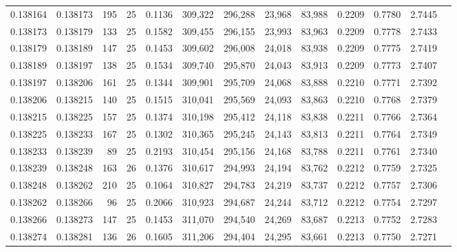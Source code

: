 \begin{tabular}{rrrrrrrrrrrrr}
0.138164 & 0.138173 &   195 &  25 &                                     0.1136 & 309,322 & 296,288 &  23,968 &  83,988 & 0.2209 & 0.7780 & 2.7445 \\
0.138173 & 0.138179 &   133 &  25 &                                     0.1582 & 309,455 & 296,155 &  23,993 &  83,963 & 0.2209 & 0.7778 & 2.7433 \\
0.138179 & 0.138189 &   147 &  25 &                                     0.1453 & 309,602 & 296,008 &  24,018 &  83,938 & 0.2209 & 0.7775 & 2.7419 \\
0.138189 & 0.138197 &   138 &  25 &                                     0.1534 & 309,740 & 295,870 &  24,043 &  83,913 & 0.2209 & 0.7773 & 2.7407 \\
0.138197 & 0.138206 &   161 &  25 &                                     0.1344 & 309,901 & 295,709 &  24,068 &  83,888 & 0.2210 & 0.7771 & 2.7392 \\
0.138206 & 0.138215 &   140 &  25 &                                     0.1515 & 310,041 & 295,569 &  24,093 &  83,863 & 0.2210 & 0.7768 & 2.7379 \\
0.138215 & 0.138225 &   157 &  25 &                                     0.1374 & 310,198 & 295,412 &  24,118 &  83,838 & 0.2211 & 0.7766 & 2.7364 \\
0.138225 & 0.138233 &   167 &  25 &                                     0.1302 & 310,365 & 295,245 &  24,143 &  83,813 & 0.2211 & 0.7764 & 2.7349 \\
0.138233 & 0.138239 &    89 &  25 &                                     0.2193 & 310,454 & 295,156 &  24,168 &  83,788 & 0.2211 & 0.7761 & 2.7340 \\
0.138239 & 0.138248 &   163 &  26 &                                     0.1376 & 310,617 & 294,993 &  24,194 &  83,762 & 0.2212 & 0.7759 & 2.7325 \\
0.138248 & 0.138262 &   210 &  25 &                                     0.1064 & 310,827 & 294,783 &  24,219 &  83,737 & 0.2212 & 0.7757 & 2.7306 \\
0.138262 & 0.138266 &    96 &  25 &                                     0.2066 & 310,923 & 294,687 &  24,244 &  83,712 & 0.2212 & 0.7754 & 2.7297 \\
0.138266 & 0.138273 &   147 &  25 &                                     0.1453 & 311,070 & 294,540 &  24,269 &  83,687 & 0.2213 & 0.7752 & 2.7283 \\
0.138274 & 0.138281 &   136 &  26 &                                     0.1605 & 311,206 & 294,404 &  24,295 &  83,661 & 0.2213 & 0.7750 & 2.7271 \\

\end{tabular}
